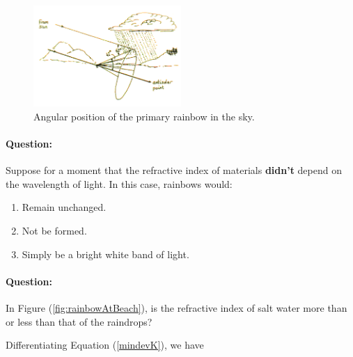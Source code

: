 
\begin{figure}[!htb]
    \centering
    \includegraphics[width=0.5\textwidth]{figs/rainarc.png}
    \caption{Angular position of the primary rainbow in the sky.}
    \label{fig:rainbowSky}
\end{figure}


\begin{question}
\paragraph{Question:} Suppose for a moment that the refractive index of materials \textbf{didn't} depend on the wavelength of light. In this case, rainbows would:
\begin{enumerate}
\itemsep0em
    \item Remain unchanged.
    \item Not be formed.
    \item Simply be a bright white band of light.
\end{enumerate}

\paragraph{Question:} In Figure (\ref{fig:rainbowAtBeach}), is the refractive index of salt water more than or less than that of the raindrops?
\end{question}

Differentiating Equation (\ref{mindevK}), we have

